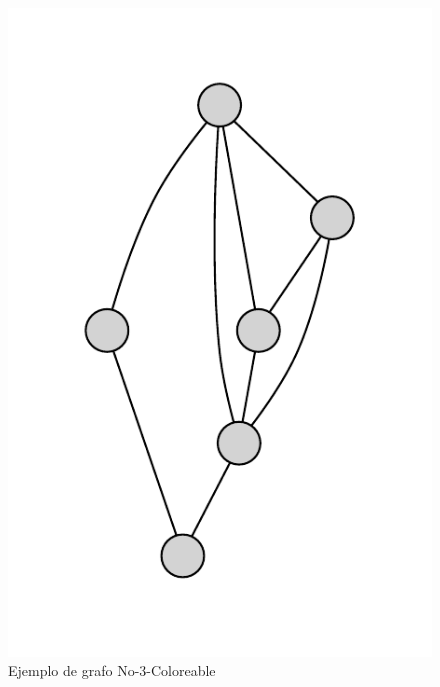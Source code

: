 \begin{figure}[h!]
\centering
\includegraphics[totalheight=0.4\textheight, angle=90]{figuras/clique4.pdf}
\caption[Ejemplo de grafo \textit{No-3-Coloreable}]{Ejemplo de grafo No-3-Coloreable}
\label{noclique}  
\end{figure}